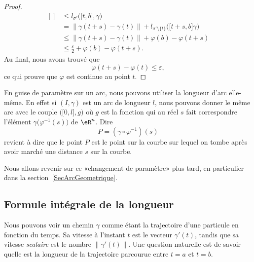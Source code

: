 \begin{proof}
\begin{equation}
\begin{aligned}[]
			                                              & \leq l_{\sigma'}\big( \mathopen[ t , b \mathclose],\gamma \big)                                                   \\
			                                              & = \big\| \gamma(t+s)-\gamma(t) \big\|+l_{\sigma'\setminus\{ t \}}\big( \mathopen[ t+s , b \mathclose]\gamma \big) \\
			                                              & \leq\| \gamma(t+s)-\gamma(t) \|+\varphi(b)-\varphi(t+s)                                                           \\
			                                              & \leq \frac{ \varepsilon }{2}+\varphi(b)-\varphi(t+s).
		\end{aligned}
	\end{equation}
	Au final, nous avons trouvé que
	\begin{equation}
		\varphi(t+s)-\varphi(t)\leq\varepsilon,
	\end{equation}
	ce qui prouve que \( \varphi\) est continue au point \( t\).
\end{proof}

En guise de paramètre sur un arc, nous pouvons utiliser la longueur d'arc elle-même. En effet si \( (I,\gamma)\) est un arc de longueur \( l\), nous pouvons donner le même arc avec le couple \( \big( \mathopen[ 0 , l \mathclose],g \big)\) où \( g\) est la fonction qui au réel \( s\) fait correspondre l'élément \( \gamma\big( \varphi^{-1}(s) \big)\) de \( \eR^n\). Dire
\begin{equation}
	P=(\gamma\circ\varphi^{-1})(s)
\end{equation}
revient à dire que le point \( P\) est le point sur la courbe sur lequel on tombe après avoir marché une distance \( s\) sur la courbe.

Nous allons revenir sur ce «changement de paramètre» plus tard, en particulier dans la section~\ref{SecArcGeometrique}.

\subsection{Formule intégrale de la longueur}

Nous pouvons voir un chemin \( \gamma\) comme étant la trajectoire d'une particule en fonction du temps. Sa vitesse à l'instant \( t\) est le vecteur \( \gamma'(t)\), tandis que sa vitesse \emph{scalaire} est le nombre \( \| \gamma'(t) \|\). Une question naturelle est de savoir quelle est la longueur de la trajectoire parcourue entre \( t=a\) et \( t=b\).

